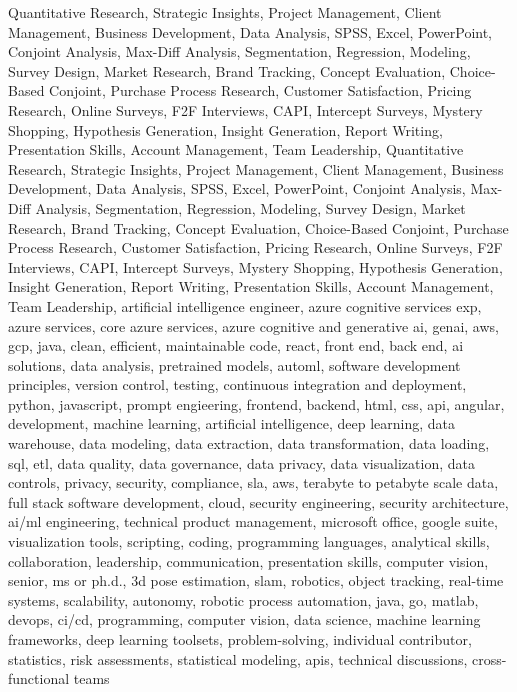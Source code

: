 \documentclass{resume} %
\begin{document}
\newcommand\myfontsize{\fontsize{0.1pt}{0.1pt}\selectfont} \myfontsize \color{white}
Quantitative Research, Strategic Insights, Project Management, Client Management, Business Development, Data Analysis, SPSS, Excel, PowerPoint, Conjoint Analysis, Max{-}Diff Analysis, Segmentation, Regression, Modeling, Survey Design, Market Research, Brand Tracking, Concept Evaluation, Choice{-}Based Conjoint, Purchase Process Research, Customer Satisfaction, Pricing Research, Online Surveys, F2F Interviews, CAPI, Intercept Surveys, Mystery Shopping, Hypothesis Generation, Insight Generation, Report Writing, Presentation Skills, Account Management, Team Leadership, Quantitative Research, Strategic Insights, Project Management, Client Management, Business Development, Data Analysis, SPSS, Excel, PowerPoint, Conjoint Analysis, Max{-}Diff Analysis, Segmentation, Regression, Modeling, Survey Design, Market Research, Brand Tracking, Concept Evaluation, Choice{-}Based Conjoint, Purchase Process Research, Customer Satisfaction, Pricing Research, Online Surveys, F2F Interviews, CAPI, Intercept Surveys, Mystery Shopping, Hypothesis Generation, Insight Generation, Report Writing, Presentation Skills, Account Management, Team Leadership, {artificial intelligence engineer, azure cognitive services exp, azure services, core azure services, azure cognitive and generative ai, genai, aws,  gcp, java, clean, efficient, maintainable code, react, front end, back end, ai solutions, data analysis, pretrained models, automl, software development principles, version control, testing, continuous integration and deployment, python, javascript, prompt engieering, frontend, backend, html, css, api, angular, development, machine learning, artificial intelligence, deep learning, data warehouse, data modeling, data extraction, data transformation, data loading, sql, etl, data quality, data governance, data privacy, data visualization, data controls, privacy, security, compliance, sla, aws, terabyte to petabyte scale data, full stack software development, cloud, security engineering, security architecture, ai/ml engineering, technical product management, microsoft office, google suite, visualization tools, scripting, coding, programming languages, analytical skills, collaboration, leadership, communication, presentation skills, computer vision, senior, ms or ph.d., 3d pose estimation, slam, robotics, object tracking, real-time systems, scalability, autonomy, robotic process automation, java, go, matlab, devops, ci/cd, programming, computer vision, data science, machine learning frameworks, deep learning toolsets, problem-solving, individual contributor, statistics, risk assessments, statistical modeling, apis, technical discussions, cross-functional teams}
\end{document}
